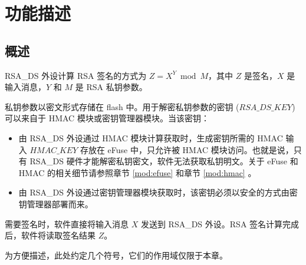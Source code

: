 \documentclass[main\_\_CN.tex]{subfiles}
\begin{document}
\section{功能描述}
\subsection{概述}

RSA\_DS 外设计算 RSA 签名的方式为 \begin{math}Z = X^{Y} \bmod M\end{math}，其中 \begin{math}Z\end{math} 是签名，\begin{math}X\end{math} 是输入消息，\begin{math}Y\end{math} 和 \begin{math}M\end{math} 是 RSA 私钥参数。

私钥参数以密文形式存储在 flash 中。用于解密私钥参数的密钥 (\begin{math} RSA\_DS\_KEY \end{math}) 可以来自于 HMAC 模块或密钥管理器模块。当该密钥：
\begin{itemize}
    \item 由 RSA\_DS 外设通过 HMAC 模块计算获取时，生成密钥所需的 HMAC 输入 \begin{math} HMAC\_KEY \end{math} 存放在 eFuse 中，只允许被 HMAC 模块访问。也就是说，只有 RSA\_DS 硬件才能解密私钥密文，软件无法获取私钥明文。关于 eFuse 和 HMAC 的相关细节请参照章节 \ref{mod:efuse} \textit{} 和章节 \ref{mod:hmac} \textit{}。
    \item 由 RSA\_DS 外设通过密钥管理器模块获取时，该密钥必须以安全的方式由密钥管理器部署而来。
\end{itemize}
需要签名时，软件直接将输入消息 \begin{math}X\end{math} 发送到 RSA\_DS 外设。RSA 签名计算完成后，软件将读取签名结果 \begin{math}Z\end{math}。

为方便描述，此处约定几个符号，它们的作用域仅限于本章。
\end{document}
